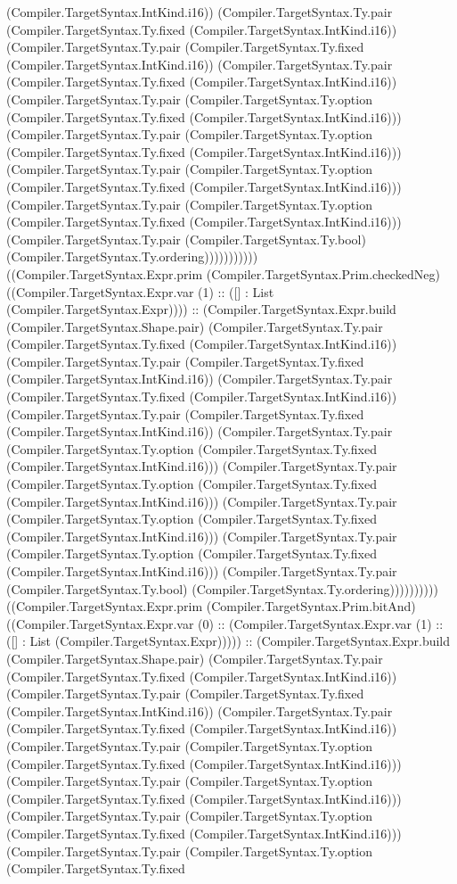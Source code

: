 \documentclass[11pt]{article}
\begin{document}
(Compiler.TargetSyntax.IntKind.i16)) (Compiler.TargetSyntax.Ty.pair (Compiler.TargetSyntax.Ty.fixed (Compiler.TargetSyntax.IntKind.i16)) (Compiler.TargetSyntax.Ty.pair (Compiler.TargetSyntax.Ty.fixed (Compiler.TargetSyntax.IntKind.i16)) (Compiler.TargetSyntax.Ty.pair (Compiler.TargetSyntax.Ty.fixed (Compiler.TargetSyntax.IntKind.i16)) (Compiler.TargetSyntax.Ty.pair (Compiler.TargetSyntax.Ty.option (Compiler.TargetSyntax.Ty.fixed (Compiler.TargetSyntax.IntKind.i16))) (Compiler.TargetSyntax.Ty.pair (Compiler.TargetSyntax.Ty.option (Compiler.TargetSyntax.Ty.fixed (Compiler.TargetSyntax.IntKind.i16))) (Compiler.TargetSyntax.Ty.pair (Compiler.TargetSyntax.Ty.option (Compiler.TargetSyntax.Ty.fixed (Compiler.TargetSyntax.IntKind.i16))) (Compiler.TargetSyntax.Ty.pair (Compiler.TargetSyntax.Ty.option (Compiler.TargetSyntax.Ty.fixed (Compiler.TargetSyntax.IntKind.i16))) (Compiler.TargetSyntax.Ty.pair (Compiler.TargetSyntax.Ty.bool) (Compiler.TargetSyntax.Ty.ordering))))))))))) ((Compiler.TargetSyntax.Expr.prim (Compiler.TargetSyntax.Prim.checkedNeg) ((Compiler.TargetSyntax.Expr.var (1) :: ([] : List (Compiler.TargetSyntax.Expr)))) :: (Compiler.TargetSyntax.Expr.build (Compiler.TargetSyntax.Shape.pair) (Compiler.TargetSyntax.Ty.pair (Compiler.TargetSyntax.Ty.fixed (Compiler.TargetSyntax.IntKind.i16)) (Compiler.TargetSyntax.Ty.pair (Compiler.TargetSyntax.Ty.fixed (Compiler.TargetSyntax.IntKind.i16)) (Compiler.TargetSyntax.Ty.pair (Compiler.TargetSyntax.Ty.fixed (Compiler.TargetSyntax.IntKind.i16)) (Compiler.TargetSyntax.Ty.pair (Compiler.TargetSyntax.Ty.fixed (Compiler.TargetSyntax.IntKind.i16)) (Compiler.TargetSyntax.Ty.pair (Compiler.TargetSyntax.Ty.option (Compiler.TargetSyntax.Ty.fixed (Compiler.TargetSyntax.IntKind.i16))) (Compiler.TargetSyntax.Ty.pair (Compiler.TargetSyntax.Ty.option (Compiler.TargetSyntax.Ty.fixed (Compiler.TargetSyntax.IntKind.i16))) (Compiler.TargetSyntax.Ty.pair (Compiler.TargetSyntax.Ty.option (Compiler.TargetSyntax.Ty.fixed (Compiler.TargetSyntax.IntKind.i16))) (Compiler.TargetSyntax.Ty.pair (Compiler.TargetSyntax.Ty.option (Compiler.TargetSyntax.Ty.fixed (Compiler.TargetSyntax.IntKind.i16))) (Compiler.TargetSyntax.Ty.pair (Compiler.TargetSyntax.Ty.bool) (Compiler.TargetSyntax.Ty.ordering)))))))))) ((Compiler.TargetSyntax.Expr.prim (Compiler.TargetSyntax.Prim.bitAnd) ((Compiler.TargetSyntax.Expr.var (0) :: (Compiler.TargetSyntax.Expr.var (1) :: ([] : List (Compiler.TargetSyntax.Expr))))) :: (Compiler.TargetSyntax.Expr.build (Compiler.TargetSyntax.Shape.pair) (Compiler.TargetSyntax.Ty.pair (Compiler.TargetSyntax.Ty.fixed (Compiler.TargetSyntax.IntKind.i16)) (Compiler.TargetSyntax.Ty.pair (Compiler.TargetSyntax.Ty.fixed (Compiler.TargetSyntax.IntKind.i16)) (Compiler.TargetSyntax.Ty.pair (Compiler.TargetSyntax.Ty.fixed (Compiler.TargetSyntax.IntKind.i16)) (Compiler.TargetSyntax.Ty.pair (Compiler.TargetSyntax.Ty.option (Compiler.TargetSyntax.Ty.fixed (Compiler.TargetSyntax.IntKind.i16))) (Compiler.TargetSyntax.Ty.pair (Compiler.TargetSyntax.Ty.option (Compiler.TargetSyntax.Ty.fixed (Compiler.TargetSyntax.IntKind.i16))) (Compiler.TargetSyntax.Ty.pair (Compiler.TargetSyntax.Ty.option (Compiler.TargetSyntax.Ty.fixed (Compiler.TargetSyntax.IntKind.i16))) (Compiler.TargetSyntax.Ty.pair (Compiler.TargetSyntax.Ty.option (Compiler.TargetSyntax.Ty.fixed 
\end{document}
